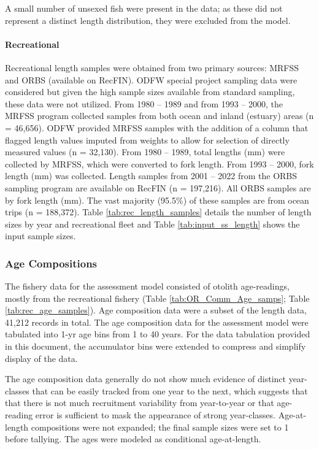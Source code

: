 \documentclass[11pt,
  english,
  letterpaper,
]{article}
\begin{document}
A small number of unsexed fish were present in the data; as these did not represent a distinct length distribution, they were excluded from the model.

\hypertarget{recreational}{%
\paragraph{Recreational}\label{recreational}}

Recreational length samples were obtained from two primary sources: MRFSS and ORBS (available on RecFIN). ODFW special project sampling data were considered but given the high sample sizes available from standard sampling, these data were not utilized. From 1980 -- 1989 and from 1993 -- 2000, the MRFSS program collected samples from both ocean and inland (estuary) areas (n = 46,656). ODFW provided MRFSS samples with the addition of a column that flagged length values imputed from weights to allow for selection of directly measured values (n = 32,130). From 1980 -- 1989, total lengths (mm) were collected by MRFSS, which were converted to fork length. From 1993 -- 2000, fork length (mm) was collected. Length samples from 2001 -- 2022 from the ORBS sampling program are available on RecFIN (n = 197,216). All ORBS samples are by fork length (mm). The vast majority (95.5\%) of these samples are from ocean trips (n = 188,372). Table \ref{tab:rec_length_samples} details the number of length sizes by year and recreational fleet and Table \ref{tab:input_ss_length} shows the input sample sizes.

\hypertarget{age-compositions}{%
\subsubsection{Age Compositions}\label{age-compositions}}

The fishery data for the assessment model consisted of otolith age-readings, mostly from the recreational fishery (Table \ref{tab:OR_Comm_Age_samps}; Table \ref{tab:rec_age_samples}). Age composition data were a subset of the length data, 41,212 records in total. The age composition data for the assessment model were tabulated into 1-yr age bins from 1 to 40 years. For the data tabulation provided in this document, the accumulator bins were extended to compress and simplify display of the data.

The age composition data generally do not show much evidence of distinct year-classes that can be easily tracked from one year to the next, which suggests that that there is not much recruitment variability from year-to-year or that age-reading error is sufficient to mask the appearance of strong year-classes. Age-at-length compositions were not expanded; the final sample sizes were set to 1 before tallying. The ages were modeled as conditional age-at-length.
\end{document}
